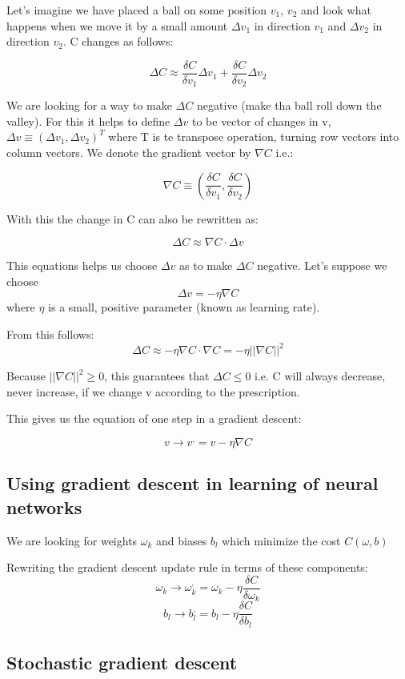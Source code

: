 \documentclass[10pt,a4paper]{article}
\begin{document}
Let's imagine we have placed a ball on some position $v_1$, $v_2$ and look what happens when we move it by a small amount $\Delta v_1$ in direction $v_1$ and $\Delta v_2$ in direction $v_2$. C changes as follows:

$$ \Delta C \approx \frac{\delta C}{\delta v_1} \Delta v_1 + \frac{\delta C}{\delta v_2} \Delta v_2 $$

We are looking for a way to make $\Delta C$ negative (make tha ball roll down the valley). For this it helps to define $\Delta v$ to be vector of changes in v, $\Delta v \equiv (\Delta v_1, \Delta v_2)^T$ where T is te transpose operation, turning row vectors into column vectors. We denote the gradient vector by $\nabla C$ i.e.:

$$ \nabla C \equiv (\frac{\delta C}{\delta v_1},\frac{\delta C}{\delta v_2}) $$

With this the change in C can also be rewritten as:

$$ \Delta C \approx \nabla C \cdot \Delta v $$

This equations helps us choose $\Delta v$ as to make $\Delta C$ negative. Let's suppose we  choose
$$
\Delta v = -\eta \nabla C
$$
where $\eta$ is a small, positive parameter (known as learning rate). 

From this follows:
$$ \Delta C \approx -\eta \nabla C \cdot \nabla C = -\eta || \nabla C ||^2$$

Because $|| \nabla C ||^2 \geq 0$, this guarantees that $\Delta C \leq 0$ i.e. C will always decrease, never increase, if we change v according to the prescription.

This gives us the equation of one step in a gradient descent:

$$ v \to v^, = v - \eta \nabla C $$

\subsection{Using gradient descent in learning of neural networks}

We are looking for weights $\omega_k$ and biases $b_l$ which minimize the cost $C(\omega, b)$

Rewriting the gradient descent update rule in terms of these components:
$$ \omega_k \to \omega_k^, = \omega_k - \eta\frac{\delta C}{\delta \omega_k} $$
$$ b_l \to b_l^, = b_l - \eta\frac{\delta C}{\delta b_l} $$

\subsection{Stochastic gradient descent}
\end{document}
